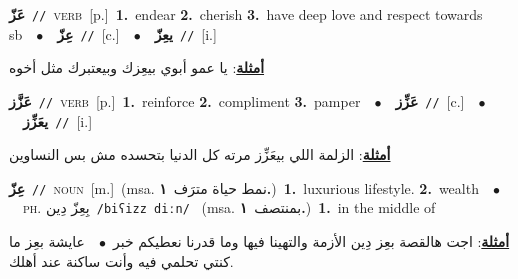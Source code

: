 \documentclass[10pt,a4paper,twoside]{article} %
\begin{document}
\begin{multicols}{2}
{\setlength\topsep{0pt}\textbf{\foreignlanguage{arabic}{عَزّ}}\ {\color{gray}\texttt{//}\color{black}}\ \textsc{verb}\ [p.]\ \textbf{1.}~endear  \textbf{2.}~cherish  \textbf{3.}~have deep love and respect towards sb\ \ $\bullet$\ \ \setlength\topsep{0pt}\textbf{\foreignlanguage{arabic}{عِزّ}}\ {\color{gray}\texttt{//}\color{black}}\ [c.]\ \ $\bullet$\ \ \setlength\topsep{0pt}\textbf{\foreignlanguage{arabic}{يعِزّ}}\ {\color{gray}\texttt{//}\color{black}}\ [i.]\  \begin{flushright}\color{gray}\foreignlanguage{arabic}{\textbf{\underline{\foreignlanguage{arabic}{أمثلة}}}: يا عمو أبوي بيعِزك وبيعتبرك مثل أخوه}\end{flushright}\color{black}} \vspace{2mm}

{\setlength\topsep{0pt}\textbf{\foreignlanguage{arabic}{عَزَّز}}\ {\color{gray}\texttt{//}\color{black}}\ \textsc{verb}\ [p.]\ \textbf{1.}~reinforce  \textbf{2.}~compliment  \textbf{3.}~pamper\ \ $\bullet$\ \ \setlength\topsep{0pt}\textbf{\foreignlanguage{arabic}{عَزِّز}}\ {\color{gray}\texttt{//}\color{black}}\ [c.]\ \ $\bullet$\ \ \setlength\topsep{0pt}\textbf{\foreignlanguage{arabic}{يعَزِّز}}\ {\color{gray}\texttt{//}\color{black}}\ [i.]\  \begin{flushright}\color{gray}\foreignlanguage{arabic}{\textbf{\underline{\foreignlanguage{arabic}{أمثلة}}}: الزلمة اللي بيعَزِّز مرته كل الدنيا بتحسده مش بس النساوين}\end{flushright}\color{black}} \vspace{2mm}

{\setlength\topsep{0pt}\textbf{\foreignlanguage{arabic}{عِزّ}}\ {\color{gray}\texttt{//}\color{black}}\ \textsc{noun}\ [m.]\ \color{gray}(msa. \foreignlanguage{arabic}{نمط حياة مترَف}~\foreignlanguage{arabic}{\textbf{١.}})\color{black}\ \textbf{1.}~luxurious lifestyle.  \textbf{2.}~wealth\ \ $\bullet$\ \ \textsc{ph.} \color{gray} \foreignlanguage{arabic}{بِعِزّ دِين}\color{black}\ {\color{gray}\texttt{/{\sffamily biʕizz diːn}/}\color{black}}\ \color{gray} (msa. \foreignlanguage{arabic}{بمنتصف}~\foreignlanguage{arabic}{\textbf{١.}})\color{black}\ \textbf{1.}~in the middle of\  \begin{flushright}\color{gray}\foreignlanguage{arabic}{\textbf{\underline{\foreignlanguage{arabic}{أمثلة}}}: اجت هالقصة بعِز دِين الأزمة والتهينا فيها وما قدرنا نعطيكم خبر\ $\bullet$\ \  عايشة بعِز ما كنتي تحلمي فيه وأنت ساكنة عند أهلك.}\end{flushright}\color{black}} \vspace{2mm}


\end{multicols}
\end{document}
